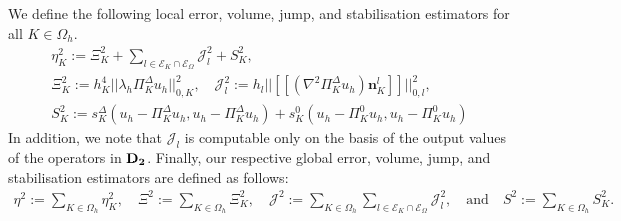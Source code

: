 \documentclass[final,reqno]{elsarticle}
\def\O{\Omega}
\def\PiK{\Pi_{K}^{\Delta}}
\begin{document}
We define the following local error, volume, jump, and stabilisation estimators for all $K\in \Omega_h$.
\begin{gather*}
\eta_K^2 := \Xi_K^2 + \sum_{l\in \mathcal{E}_K\cap \mathcal{E}_{\O}}  \mathcal{J}_{l}^2 + S_K^2,\\
\Xi_{K}^2 := h_K^4 ||\lambda_h\PiK u_h ||_{0,K}^2, \quad  \mathcal{J}_{l}^2 := h_{l}
||[\![(\nabla^2\PiK u_h )\boldsymbol{n}_K^{l}]\!] ||_{0,l}^2,\\
S_{K}^2
:= s_K^{\Delta}(u_h-\PiK u_h,u_h-\PiK u_h) + s_{K}^0(u_h-\Pi_K^0 u_h,u_h-\Pi_K^0 u_h)
\end{gather*}
In addition, we note that $\mathcal{J}_l$ is computable only on the basis of the output values of the operators in ${\bf D_2}$. Finally, our respective global error, volume, jump, and stabilisation estimators are defined as follows:
\begin{align}\label{global_estimators}
\eta^2:=\sum\limits_{K\in \Omega_h} \eta_K^2, \quad \Xi^2 := \sum\limits_{K\in \Omega_h} \Xi_K^2, \quad \mathcal{J}^2 := \sum\limits_{K\in \Omega_h} \sum_{l\in \mathcal{E}_K\cap \mathcal{E}_{\O}} \mathcal{J}_{l}^2, \quad \text{and} \quad S^2 := \sum\limits_{K\in \Omega_h} S_K^2.
\end{align}
\end{document}
